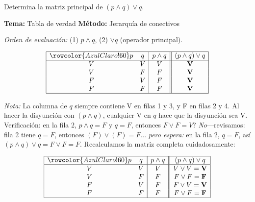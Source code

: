 \begin{tcolorbox}[
  enhanced, breakable,
  colback=GrisClaro, colframe=AzulPizarra,
  fonttitle=\bfseries\sffamily,
  title={Ejercicio 6 — Matriz principal de $(p \wedge q) \vee q$},
  arc=3pt, boxrule=0.8pt
]

\begin{problema}
Determina la matriz principal de $(p \wedge q) \vee q$.
\end{problema}

\smallskip
\noindent
\textbf{\sffamily\color{AzulMedio}Tema:} Tabla de verdad \hfill
\textbf{\sffamily\color{AzulMedio}Método:} Jerarquía de conectivos

\medskip
\noindent\textit{Orden de evaluación:} (1) $p \wedge q$, (2) $\vee q$ (operador principal).

\[
\begin{array}{|cc|c||c|}
\hline
\rowcolor{AzulClaro!60}
p & q & p \wedge q & (p \wedge q) \vee q \\
\hline
V & V & V & \mathbf{V} \\
V & F & F & \mathbf{V} \\
F & V & F & \mathbf{V} \\
F & F & F & \mathbf{V} \\
\hline
\end{array}
\]

\noindent\textit{Nota:} La columna de $q$ siempre contiene V en filas 1 y 3, y F en filas 2 y 4. Al hacer la disyunción con $(p \wedge q)$, cualquier V en $q$ hace que la disyunción sea V.\\[2pt]
\noindent Verificación: en la fila 2, $p \wedge q = F$ y $q = F$, entonces $F \vee F = V$? \textit{No}—revisamos: fila 2 tiene $q = F$, entonces $(F) \vee (F) = F$... \textit{pero espera:} en la fila 2, $q = F$, así $(p \wedge q) \vee q = F \vee F = F$. Recalculamos la matriz completa cuidadosamente:

\[
\begin{array}{|cc|c||c|}
\hline
\rowcolor{AzulClaro!60}
p & q & p \wedge q & (p \wedge q) \vee q \\
\hline
V & V & V & V \vee V = \mathbf{V} \\
V & F & F & F \vee F = \mathbf{F} \\
F & V & F & F \vee V = \mathbf{V} \\
F & F & F & F \vee F = \mathbf{F} \\
\hline
\end{array}
\]


\end{tcolorbox}
